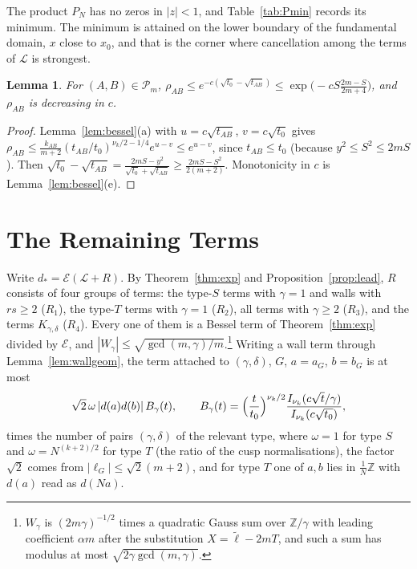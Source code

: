 \documentclass[11pt]{amsart}
\numberwithin{equation}{section}
\theoremstyle{plain}
\newtheorem{lem}[thm]{Lemma}
\theoremstyle{definition}
\theoremstyle{remark}
\newcommand{\Z}{\mathbb{Z}}
\newcommand{\cE}{\mathcal{E}}
\newcommand{\cL}{\mathcal{L}}
\begin{document}
The product $P_N$ has no zeros in $|z|<1$, and Table~\ref{tab:Pmin} records its minimum. The minimum is attained on the lower boundary of the fundamental domain, $x$ close to $x_0$, and that is the corner where cancellation among the terms of $\cL$ is strongest.

\begin{lem}\label{lem:tail}
For $(A,B)\in\mathcal P_m$, $\rho_{AB}\le e^{-c(\sqrt{t_0}-\sqrt{t_{AB}})}\le\exp\bigl(-cS\frac{2m-S}{2m+4}\bigr)$, and $\rho_{AB}$ is decreasing in $c$.
\end{lem}

\begin{proof}
Lemma~\ref{lem:bessel}(a) with $u=c\sqrt{t_{AB}}$, $v=c\sqrt{t_0}$ gives $\rho_{AB}\le\frac{k_{AB}}{m+2}(t_{AB}/t_0)^{\nu_k/2-1/4}e^{u-v}\le e^{u-v}$, since $t_{AB}\le t_0$ (because $y^2\le S^2\le 2mS$). Then $\sqrt{t_0}-\sqrt{t_{AB}}=\frac{2mS-y^2}{\sqrt{t_0}+\sqrt{t_{AB}}}\ge\frac{2mS-S^2}{2(m+2)}$. Monotonicity in $c$ is Lemma~\ref{lem:bessel}(e).
\end{proof}

\section{The Remaining Terms}\label{sec:err}

Write $d_*=\cE(\cL+R)$. By Theorem~\ref{thm:exp} and Proposition~\ref{prop:lead}, $R$ consists of four groups of terms: the type-$S$ terms with $\gamma=1$ and walls with $rs\ge2$ ($R_1$), the type-$T$ terms with $\gamma=1$ ($R_2$), all terms with $\gamma\ge2$ ($R_3$), and the terms $K_{\gamma,\delta}$ ($R_4$). Every one of them is a Bessel term of Theorem~\ref{thm:exp} divided by $\cE$, and $|W_\gamma|\le\sqrt{\gcd(m,\gamma)/m}$.\footnote{$W_\gamma$ is $(2m\gamma)^{-1/2}$ times a quadratic Gauss sum over $\Z/\gamma$ with leading coefficient $\alpha m$ after the substitution $X=\tilde\ell-2mT$, and such a sum has modulus at most $\sqrt{2\gamma\gcd(m,\gamma)}$.} Writing a wall term through Lemma~\ref{lem:wallgeom}, the term attached to $(\gamma,\delta)$, $G$, $a=a_G$, $b=b_G$ is at most
\begin{equation}\label{eq:wallterm}
\sqrt2\,\omega\,|d(a)d(b)|\,B_\gamma(t),\qquad B_\gamma(t)=\Bigl(\frac{t}{t_0}\Bigr)^{\nu_k/2}\frac{I_{\nu_k}(c\sqrt t/\gamma)}{I_{\nu_k}(c\sqrt{t_0})},
\end{equation}
times the number of pairs $(\gamma,\delta)$ of the relevant type, where $\omega=1$ for type $S$ and $\omega=N^{(k+2)/2}$ for type $T$ (the ratio of the cusp normalisations), the factor $\sqrt2$ comes from $|\ell_G|\le\sqrt2(m+2)$, and for type $T$ one of $a,b$ lies in $\frac1N\Z$ with $d(a)$ read as $d(Na)$.
\end{document}
